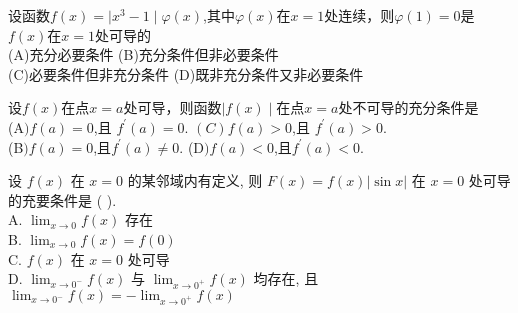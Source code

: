 \documentclass[8pt a4paper, oneside, UTF8]{ctexbook}  %
\begin{document}
\begin{sloppypar}
\begin{solution}
    \end{solution}
    \begin{problem}
        设函数$f(x)=\mid x^3-1\mid\varphi(x)$,其中$\varphi(x)$在$x=1$处连续，则$\varphi(1)=0$是$f(x)$在$x=1$处可导的 \\
        (A)充分必要条件 \quad (B)充分条件但非必要条件\\
        (C)必要条件但非充分条件 \quad (D)既非充分条件又非必要条件 
    \end{problem}
    \begin{solution}
    \end{solution}
    \begin{problem}
        设$f(x)$在点$x=a$处可导，则函数$\mid f(x)\mid$在点$x=a$处不可导的充分条件是\\
        (A$)f(a)=0$,且 $f^\prime(a)=0.$ \quad $(C)f(a)>0$,且 $f^\prime(a)>0.$ \\
        (B$)f(a)=0$,且$f^\prime(a)\neq0.$ \quad   (D$)f(a)<0$,且$f^\prime(a)<0.$        
    \end{problem}
    \begin{solution}
            
    \end{solution}
    \begin{problem}
    设 $f(x)$ 在 $x=0$ 的某邻域内有定义, 则 $F(x)=f(x)|\sin x|$ 在 $x=0$ 处可导的充要条件是 ( ).\\
    A. $\lim _{x \rightarrow 0} f(x)$ 存在\\
    B. $\lim _{x \rightarrow 0} f(x)=f(0)$\\
    C. $f(x)$ 在 $x=0$ 处可导\\
    D. $\lim _{x \rightarrow 0^{-}} f(x)$ 与 $\lim _{x \rightarrow 0^{+}} f(x)$ 均存在, 且 $\lim _{x \rightarrow 0^{-}} f(x)=-\lim _{x \rightarrow 0^{+}} f(x)$            
    \end{problem}
    \begin{solution}
            
    \end{solution}


\end{sloppypar}
\end{document}
